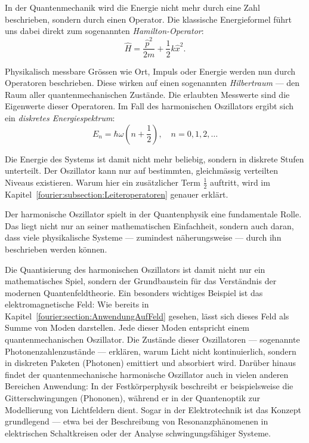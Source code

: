 	In der Quantenmechanik wird die Energie nicht mehr durch eine Zahl beschrieben, sondern durch einen Operator.
	Die klassische Energieformel führt uns dabei direkt zum sogenannten \emph{Hamilton-Operator}:
	\begin{equation}
	\hat{H} = \frac{\hat{p}^2}{2m} + \frac{1}{2} k \hat{x}^2.
	\label{fourier:equation:hamiltonOperator}
	\end{equation}

	Physikalisch messbare Grössen wie Ort, Impuls oder Energie werden nun durch Operatoren beschrieben.
	Diese wirken auf einen sogenannten \emph{Hilbertraum} — den Raum aller quantenmechanischen Zustände.
	Die erlaubten Messwerte sind die Eigenwerte dieser Operatoren.
	Im Fall des harmonischen Oszillators ergibt sich ein \emph{diskretes Energiespektrum}:
	\[
	E_n = \hbar \omega \left(n + \frac{1}{2} \right), \quad n = 0, 1, 2, \dots
	\]

	Die Energie des Systems ist damit nicht mehr beliebig, sondern in diskrete Stufen unterteilt.
	Der Oszillator kann nur auf bestimmten, gleichmässig verteilten Niveaus existieren.
	Warum hier ein zusätzlicher Term $\frac{1}{2}$ auftritt, wird im Kapitel~\ref{fourier:subsection:Leiteroperatoren} genauer erklärt.

	Der harmonische Oszillator spielt in der Quantenphysik eine fundamentale Rolle.
	Das liegt nicht nur an seiner mathematischen Einfachheit, sondern auch daran, dass viele physikalische Systeme — zumindest näherungsweise — durch ihn beschrieben werden können.

	Die Quantisierung des harmonischen Oszillators ist damit nicht nur ein mathematisches Spiel, sondern der Grundbaustein für das Verständnis der modernen Quantenfeldtheorie.
	Ein besonders wichtiges Beispiel ist das elektromagnetische Feld:
	Wie bereits in Kapitel~\ref{fourier:section:AnwendungAufFeld} gesehen, lässt sich dieses Feld als Summe von Moden darstellen.
	Jede dieser Moden entspricht einem quantenmechanischen Oszillator.
	Die Zustände dieser Oszillatoren — sogenannte Photonenzahlenzustände — erklären, warum Licht nicht kontinuierlich, sondern in diskreten Paketen (Photonen) emittiert und absorbiert wird.
	Darüber hinaus findet der quantenmechanische harmonische Oszillator auch in vielen anderen Bereichen Anwendung:
	In der Festkörperphysik beschreibt er beispielsweise die Gitterschwingungen (Phononen), während er in der Quantenoptik zur Modellierung von Lichtfeldern dient.
	Sogar in der Elektrotechnik ist das Konzept grundlegend ---
	etwa bei der Beschreibung von Resonanzphänomenen in elektrischen Schaltkreisen oder der Analyse schwingungsfähiger Systeme.

